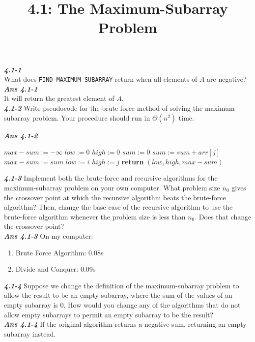 \documentclass[a4paper]{article}
\title{4.1: The Maximum-Subarray Problem}
\author{}
\date{}
\begin{document}
\maketitle

\textit{\textbf{4.1-1}} \\
What does \texttt{FIND-MAXIMUM-SUBARRAY} return when all elements of $A$ are negative?\\
\textit{\textbf{Ans 4.1-1}} \\
It will return the greatest element of $A$.\\

\textit{\textbf{4.1-2}} Write pseudocode for the brute-force method of solving the maximum-subarray problem. Your procedure should run in $\Theta(n^2)$ time.

\textit{\textbf{Ans 4.1-2}} \\
\begin{algorithm}
	\caption{BRUTE-FORCE-FIND-MAXIMUM-SUBARRAY}
	\begin{algorithmic}[1]
		\Statex
		\State $max-sum := -\infty$
		\State $low := 0$
		\State $high := 0$
			\State $sum := 0$
				\State $sum := sum + arr[j]$
					\State $max-sum := sum$
					\State $low := i$
					\State $high := j$
				\EndIf
			\EndFor
		\EndFor
		\State \textbf{return} $\left( low, high, max-sum\right)$
		\EndProcedure
	\end{algorithmic}
\end{algorithm}
\newpage
\textit{\textbf{4.1-3}} Implement both the brute-force and recursive algorithms for the maximum-subarray problem on your own computer. What problem size $n_0$ gives the crossover point at which the recursive algorithm beats the brute-force algorithm? Then, change the base case of the recursive algorithm to use the brute-force algorithm whenever the problem size is less than $n_0$. Does that change the crossover point? \\
\textit{\textbf{Ans 4.1-3}} On my computer:
\begin{enumerate}
 \item Brute Force Algorithm: 0.08s
 \item Divide and Conquer: 0.09s
\end{enumerate}

\textit{\textbf{4.1-4}} Suppose we change the definition of the maximum-subarray problem to allow the result to be an empty subarray, where the sum of the values of an empty subarray is $0$. How would you change any of the algorithms that do not allow empty subarrays to permit an empty subarray to be the result? \\
\textit{\textbf{Ans 4.1-4}} If the original algorithm returns a negative sum, returning an empty subarray instead. \\
\end{document}
